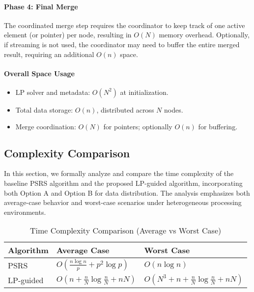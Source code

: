 \documentclass[]{interact}
\theoremstyle{plain}
\theoremstyle{definition}
\theoremstyle{remark}
\begin{document}
\paragraph{Phase 4: Final Merge}
The coordinated merge step requires the coordinator to keep track of one active element (or pointer) per node, resulting in $O(N)$ memory overhead. Optionally, if streaming is not used, the coordinator may need to buffer the entire merged result, requiring an additional $O(n)$ space.

\paragraph{Overall Space Usage}
\begin{itemize}
    \item LP solver and metadata: $O(N^2)$ at initialization.
    \item Total data storage: $O(n)$, distributed across $N$ nodes.
    \item Merge coordination: $O(N)$ for pointers; optionally $O(n)$ for buffering.
\end{itemize}




\subsection{Complexity Comparison}
In this section, we formally analyze and compare the time complexity of the baseline PSRS algorithm and the proposed LP-guided algorithm, incorporating both Option A and Option B for data distribution. The analysis emphasizes both average-case behavior and worst-case scenarios under heterogeneous processing environments.


\begin{table}[H]
\centering
\footnotesize
\renewcommand{\arraystretch}{1.5} %
\begin{tabular}{|p{3.7cm}|p{4cm}|p{5.4cm}|}
\hline
\textbf{Algorithm} & \textbf{Average Case} & \textbf{Worst Case} \\ \hline
PSRS & $O\left(\frac{n \log n}{p} + p^2 \log p\right)$ & $O(n \log n)$ \\ \hline
LP-guided & $O(n + \frac{n}{N} \log \frac{n}{N} + nN)$ & $O(N^3 + n + \frac{n}{N} \log \frac{n}{N} + nN)$ \\ \hline
\end{tabular}
\caption{Time Complexity Comparison (Average vs Worst Case)}
\end{table}
\end{document}
